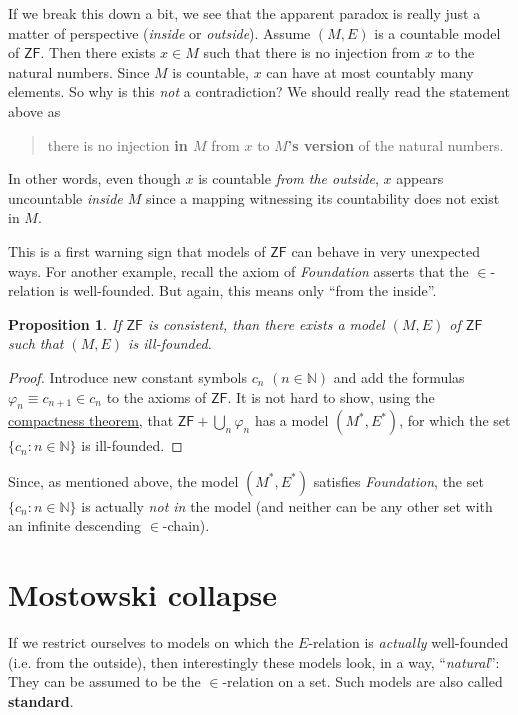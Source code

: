 \documentclass{article}
\newcommand{\ZF}{\mathsf{ZF}}
\newcommand{\Nat}{\mathbb{N}}
\newtheorem{proposition}{Proposition}[section]
\begin{document}
If we break this down a bit, we see that the apparent paradox is really just a matter of perspective (\textit{inside} or \textit{outside}). Assume $(M,E)$ is a countable model of $\ZF$. Then there exists $x \in M$ such that there is no injection from $x$ to the natural numbers. Since $M$ is countable, $x$ can have at most countably many elements. So why is this \textit{not} a contradiction? We should really read the statement above as

\begin{quote}
there is no injection \textbf{in $M$} from $x$ to \textbf{$M$'s version} of the natural numbers.
\end{quote}

In other words, even though $x$ is countable \textit{from the outside}, $x$ appears uncountable \textit{inside $M$} since a mapping witnessing its countability does not exist in $M$.

This is a first warning sign that models of $\ZF$ can behave in very unexpected ways. For another example, recall the axiom of \textit{Foundation} asserts that the $\in$-relation is well-founded. But again, this means only ``from the inside''.

\begin{proposition}\label{prop-illfounded-zf-model}If $\ZF$ is consistent, than there exists a model $(M,E)$ of $\ZF$ such that $(M,E)$ is ill-founded.

\end{proposition}\begin{proof}Introduce new constant symbols $c_n$ $(n \in \Nat)$ and add the formulas $\varphi_n \equiv c_{n+1} \in c_n$ to the axioms of $\ZF$. It is not hard to show, using the \href{https://en.wikipedia.org/wiki/Compactness\_theorem}{compactness theorem}, that $\ZF + \bigcup_n \varphi_n$ has a model $(M^*, E^*)$, for which the set $\{c_n \colon n \in \Nat\}$ is ill-founded.

\end{proof}Since, as mentioned above, the model $(M^*,E^*)$ satisfies \textit{Foundation}, the set $\{c_n \colon n \in \Nat\}$ is actually \textit{not in} the model (and neither can be any other set with an infinite descending $\in$-chain).

\section{Mostowski collapse}

If we restrict ourselves to models on which the $E$-relation is \textit{actually} well-founded (i.e. from the outside), then interestingly these models look, in a way, ``\textit{natural}'': They can be assumed to be the $\in$-relation on a set. Such models are also called \textbf{standard}.
\end{document}
